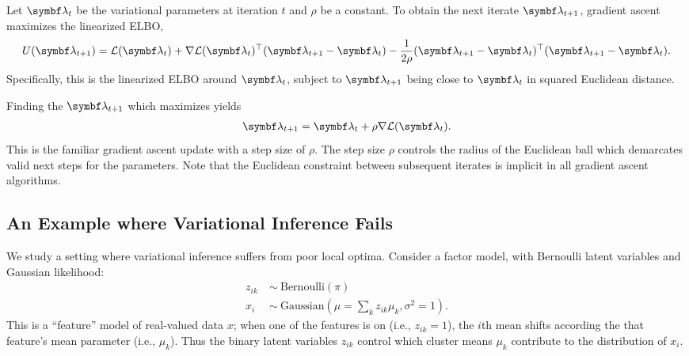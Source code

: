 Let $\mblambda_t$ be the variational parameters at iteration $t$ and $\rho$ be a constant. To obtain the next iterate $\mblambda_{t+1}$, gradient ascent maximizes the linearized \gls{ELBO},
\begin{align}
  \label{eq:linearized-elbo}
    U(\mblambda_{t+1}) = %
    \cL(\mblambda_t) +
    \nabla\cL(\mblambda_t)^\top(\mblambda_{t+1}-\mblambda_t) %
     - %
    \frac{1}{2\rho} (\mblambda_{t+1}-\mblambda_t)^\top
    (\mblambda_{t+1}-\mblambda_t).
\end{align}
Specifically, this is the linearized \gls{ELBO} around $\mblambda_t$, subject to $\mblambda_{t+1}$ being close to $\mblambda_t$ in squared Euclidean distance.

Finding the $\mblambda_{t+1}$ which maximizes  yields
\begin{align}
  \mblambda_{t+1} = \mblambda_t + \rho
  \nabla\cL(\mblambda_t). \label{eq:standard_update}
\end{align}
This is the familiar gradient ascent update with a step size of $\rho$. The step size $\rho$ controls the radius of the Euclidean ball which demarcates valid next steps for the parameters.  Note that the Euclidean constraint between subsequent iterates is implicit in all gradient ascent algorithms.

\subsection{An Example where Variational Inference Fails}
\label{sec:bernoulli_factor_model}
We study a setting where variational inference suffers from poor local optima. Consider a factor model, with Bernoulli latent variables and Gaussian likelihood:
\begin{align}
z_{ik}~&\sim~\textrm{Bernoulli}(\pi) \\
x_i~&\sim~\textrm{Gaussian}\left(\mu = \textstyle \sum_k z_{ik}
        \mu_k, \sigma^2=1\right).
\end{align}
This is a ``feature'' model of real-valued data $x$; when one of the features is on (i.e., $z_{ik}=1$), the $i$th mean shifts according the that feature's mean parameter (i.e., $\mu_{k}$).  Thus the binary latent variables $z_{ik}$ control which cluster means $\mu_k$ contribute to the distribution of $x_i$.

